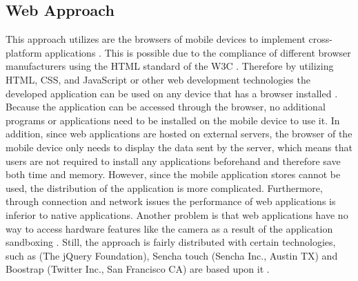 \documentclass[Bachelor,BIF,english]{twbook}
\begin{document}
\subsection{Web Approach}
This approach utilizes are the browsers of mobile devices to implement cross-platform applications \cite[p.~2]{7934674}. This is possible due to the compliance of different browser manufacturers using the HTML standard of the W3C \cite[p.~2]{LinckArne2016}. Therefore by utilizing HTML, CSS, and JavaScript or other web development technologies the developed application can be used on any device that has a browser installed \cite[p.~2]{7934674}.
\\[\baselineskip]
Because the application can be accessed through the browser, no additional programs or applications need to be installed on the mobile device to use it. In addition, since web applications are hosted on external servers, the browser of the mobile device only needs to display the data sent by the server, which means that users are not required to install any applications beforehand and therefore save both time and memory. However, since the mobile application stores cannot be used, the distribution of the application is more complicated. Furthermore, through connection and network issues the performance of web applications is inferior to native applications. Another problem is that web applications have no way to access hardware features like the camera as a result of the application sandboxing \cite[p.~626]{6420693}. Still, the approach is fairly distributed with certain technologies, such as (The jQuery Foundation), Sencha touch (Sencha Inc., Austin TX) and Boostrap (Twitter Inc., San Francisco CA) are based upon it \cite[p.~2]{7934674}.
\end{document}
